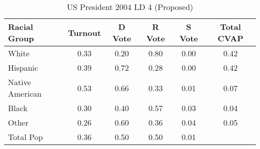 \begin{table}[htb]
\begin{center}
\caption{US President 2004 LD 4 (Proposed)}
\label{pres04_cvap_ld_4}
\begin{tabular}{lccccc}
  \hline
Racial Group & Turnout & D Vote & R Vote & S Vote & Total CVAP \\ 
  \hline
White & 0.33 & 0.20 & 0.80 & 0.00 & 0.42 \\ 
  Hispanic & 0.39 & 0.72 & 0.28 & 0.00 & 0.42 \\ 
  Native American & 0.53 & 0.66 & 0.33 & 0.01 & 0.07 \\ 
  Black & 0.30 & 0.40 & 0.57 & 0.03 & 0.04 \\ 
  Other & 0.26 & 0.60 & 0.36 & 0.04 & 0.05 \\ 
  Total Pop & 0.36 & 0.50 & 0.50 & 0.01 &  \\ 
   \hline
\end{tabular}
\end{center}
\end{table}
